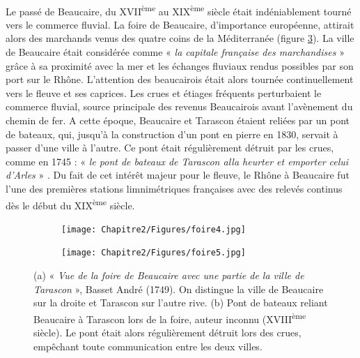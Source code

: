 \paragraph{} Le passé de Beaucaire, du XVII\textsuperscript{ème} au XIX\textsuperscript{ème} siècle était indéniablement tourné vers le commerce fluvial. La foire de Beaucaire, d'importance européenne, attirait alors des marchands venus des quatre coins de la Méditerranée (figure \ref{fig:foire}). La ville de Beaucaire était considérée comme « \textit{la capitale française des marchandises} » \citep{leon_vie_1953} grâce à sa proximité avec la mer et les échanges fluviaux rendus possibles par son port sur le Rhône. L'attention des beaucairois était alors tournée continuellement vers le fleuve et ses caprices. Les crues et étiages fréquents perturbaient le commerce fluvial, source principale des revenus Beaucairois avant l'avènement du chemin de fer. A cette époque, Beaucaire et Tarascon étaient reliées par un pont de bateaux, qui, jusqu'à la construction d'un pont en pierre en 1830, servait à passer d'une ville à l'autre. Ce pont était régulièrement détruit par les crues, comme en 1745 : « \textit{le pont de bateaux de Tarascon alla heurter et emporter celui d'Arles} » \citep{anibert_annales_1764}. Du fait de cet intérêt majeur pour le fleuve, le Rhône à Beaucaire fut l'une des premières stations limnimétriques françaises avec des relevés continus dès le début du XIX\textsuperscript{ème} siècle. 

%
\begin{figure}[h]
		\centering
            \begin{subfigure}{0.49\linewidth}
            \centering
            	\texttt{[image: Chapitre2/Figures/foire4.jpg]}\hfill
            	\caption{}
            	\label{subfig:foire1}
            \end{subfigure}
            \begin{subfigure}{0.49\linewidth}
            \centering
            	\texttt{[image: Chapitre2/Figures/foire5.jpg]}
            	\caption{}
           		\label{subfig:foire2}
            \end{subfigure}
\caption{(a) « \textit{Vue de la foire de Beaucaire avec une partie de la ville de Tarascon} », Basset André (1749). On distingue la ville de Beaucaire sur la droite et Tarascon sur l'autre rive. 
(b) Pont de bateaux reliant Beaucaire à Tarascon lors de la foire, auteur inconnu (XVIII\textsuperscript{ème} siècle). Le pont était alors régulièrement détruit lors des crues, empêchant toute communication entre les deux villes.}
\label{fig:foire}
\end{figure}

